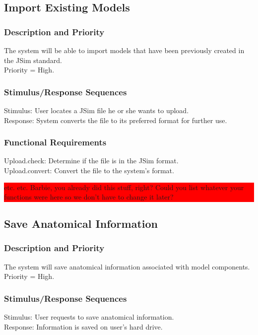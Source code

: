 \documentclass{article}
\newcommand{\todo}[1]{\colorbox{red}{\begin{minipage}{\textwidth}{#1}\end{minipage}}}
\begin{document}
\subsection{Import Existing Models}

\subsubsection{Description and Priority}
The system will be able to import models that have been previously created in the JSim standard.\\
Priority = High.

\subsubsection{Stimulus/Response Sequences}
Stimulus: User locates a JSim file he or she wants to upload.\\
Response: System converts the file to its preferred format for further use.

\subsubsection{Functional Requirements}
Upload.check: Determine if the file is in the JSim format.\\
Upload.convert: Convert the file to the system's format.

\todo{etc. etc. Barbie, you already did this stuff, right?  Could you list whatever your functions were here so we don't have to change it later?}

\subsection{Save Anatomical Information}
\subsubsection{Description and Priority}
The system will save anatomical information associated with model components.\\
Priority = High.

\subsubsection{Stimulus/Response Sequences}
Stimulus: User requests to save anatomical information.\\
Response: Information is saved on user's hard drive.
\end{document}
